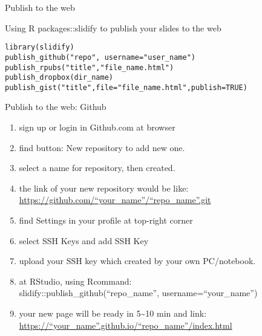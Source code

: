 \documentclass[ignorenonframetext,]{beamer}
\providecommand{\tightlist}{%
  \setlength{\itemsep}{0pt}\setlength{\parskip}{0pt}}
\begin{document}
\begin{frame}[fragile]{Publish to the web}

Using R packages::slidify to publish your slides to the web

\begin{verbatim}
library(slidify)
publish_github("repo", username="user_name")
publish_rpubs("title","file_name.html")
publish_dropbox(dir_name)
publish_gist("title",file="file_name.html",publish=TRUE)
\end{verbatim}

\end{frame}

\begin{frame}{Publish to the web: Github}

\begin{enumerate}
\def\labelenumi{\arabic{enumi}.}
\tightlist
\item
  sign up or login in Github.com at browser
\item
  find button: New repository to add new one.
\item
  select a name for repository, then created.
\item
  the link of your new repository would be like:\\
  \href{https://github.com/your_name/repo_name.git}{https://github.com/``your\_name''/``repo\_name''.git}
\item
  find Settings in your profile at top-right corner
\item
  select SSH Keys and add SSH Key
\item
  upload your SSH key which created by your own PC/notebook.
\item
  at RStudio, using Rcommand:\\
  slidify::publish\_github(``repo\_name'', username=``your\_name'')
\item
  your new page will be ready in 5\textasciitilde{}10 min and link:\\
  \href{https://your_name.github.io/repo_name/index.html}{https://``your\_name''.github.io/``repo\_name''/index.html}
\end{enumerate}

\end{frame}
\end{document}
